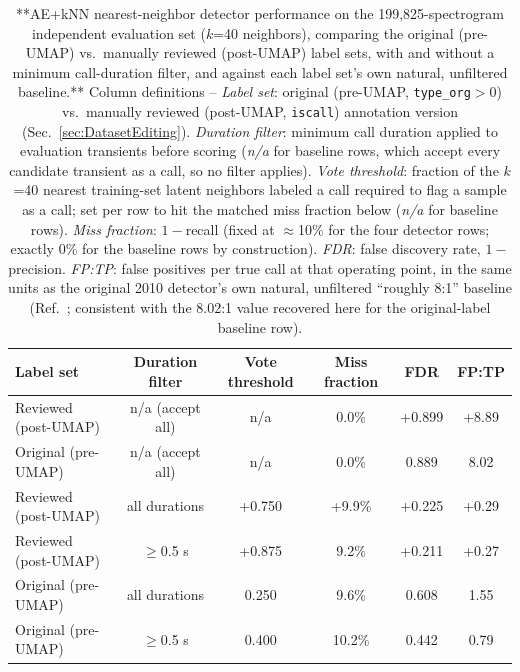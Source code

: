 \documentclass[preprint,NumberedRefs]{JASAnew}
\begin{document}
\begin{table}[ht]
    \centering
    \caption{**AE+kNN nearest-neighbor detector performance on the
    199,825-spectrogram independent evaluation set ($k$=40 neighbors),
    comparing the original (pre-UMAP) vs.\ manually reviewed (post-UMAP)
    label sets, with and without a minimum call-duration filter, and against
    each label set's own natural, unfiltered baseline.** Column definitions --
    \emph{Label set}: original (pre-UMAP, \texttt{type\_org}$>$0) vs.\
    manually reviewed (post-UMAP, \texttt{iscall}) annotation version
    (Sec.~\ref{sec:DatasetEditing}). \emph{Duration filter}: minimum call
    duration applied to evaluation transients before scoring (\emph{n/a} for
    baseline rows, which accept every candidate transient as a call, so no
    filter applies). \emph{Vote threshold}: fraction of the $k$=40 nearest
    training-set latent neighbors labeled a call required to flag a sample as
    a call; set per row to hit the matched miss fraction below (\emph{n/a}
    for baseline rows). \emph{Miss fraction}: $1-$recall (fixed at
    $\approx$10\% for the four detector rows; exactly 0\% for the baseline
    rows by construction). \emph{FDR}: false discovery rate, $1-$precision.
    \emph{FP:TP}: false positives per true call at that operating point, in
    the same units as the original 2010 detector's own natural, unfiltered
    ``roughly 8:1'' baseline (Ref.~\citenum{thode2012automated}; consistent
    with the 8.02:1 value recovered here for the original-label baseline
    row).}
    \label{tab:ae_knn_results}
    \begin{tabular}{|l|c|c|c|c|c|}
        \hline
        Label set & Duration filter & Vote threshold & Miss fraction & FDR & FP:TP \\
        \hline
        Reviewed (post-UMAP) & n/a (accept all)  & n/a   & 0.0\%  & {+}0.899 & {+}8.89 \\
        Original (pre-UMAP)  & n/a (accept all)  & n/a   & 0.0\%  & 0.889 & 8.02 \\
        \hline
        Reviewed (post-UMAP) & all durations     & {+}0.750 & {+}9.9\%  & {+}0.225 & {+}0.29 \\
        Reviewed (post-UMAP) & $\geq$0.5 s        & {+}0.875 & 9.2\%  & {+}0.211 & {+}0.27 \\
        Original (pre-UMAP)  & all durations     & 0.250 & 9.6\%  & 0.608 & 1.55 \\
        Original (pre-UMAP)  & $\geq$0.5 s        & 0.400 & 10.2\% & 0.442 & 0.79 \\
        \hline
    \end{tabular}
\end{table}
\end{document}
